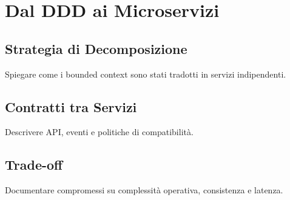 \chapter{Dal DDD ai Microservizi}

\section{Strategia di Decomposizione}
Spiegare come i bounded context sono stati tradotti in servizi indipendenti.

\section{Contratti tra Servizi}
Descrivere API, eventi e politiche di compatibilità.

\section{Trade-off}
Documentare compromessi su complessità operativa, consistenza e latenza.
